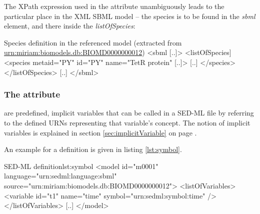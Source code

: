 The XPath expression used in the  attribute unambiguously leads to the particular place in the XML SBML model -- the species is to be found in the \emph{sbml} element, and there inside the \emph{listOfSpecies}:
%
\begin{myXmlLst}{Species definition in the referenced model (extracted from \url{urn:miriam:biomodels.db:BIOMD0000000012})}{}
<sbml [..]>
 <listOfSpecies]
  <species metaid="PY" id="PY" name="TetR protein" [..]>
   [..]
  </species>
 </listOfSpecies>
 [..]
</sbml>
\end{myXmlLst}
%

\subsubsection{The  attribute}
\label{sec:symbol}

 are predefined, implicit variables that can be called in a SED-ML file by referring to the defined URNs representing that variable's concept. The notion of implicit variables is explained in section \ref{sec:implicitVariable} on page .

An example for a  definition is given in listing \ref{lst:symbol}.
%
\begin{myXmlLst}{SED-ML  definition}{lst:symbol}
<model id="m0001" language="urn:sedml:language:sbml" source="urn:miriam:biomodels.db:BIOMD0000000012">
 <listOfVariables>
  <variable id="t1" name="time" symbol="urn:sedml:symbol:time" />
 </listOfVariables>
 [..]
</model>
\end{myXmlLst}
%



